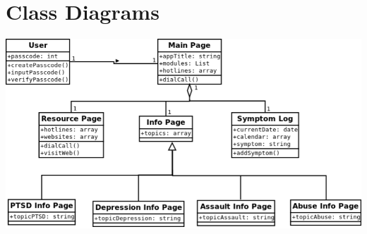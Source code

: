 \documentclass[letterpaper,12pt,titlepage]{article}
\begin{document}
\newpage
\section{Class Diagrams}
\vspace{50pt}
\hspace*{-1in}
\includegraphics[scale=.55]{UML_Diagram}~\cite{umldia}


\newpage
\end{document}
